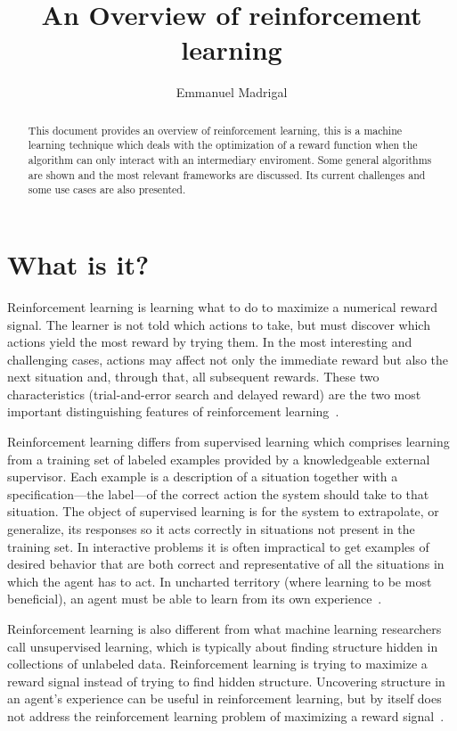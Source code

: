 \documentclass[letterpaper, 10 pt]{IEEEconf}
\title{\LARGE \bf
An Overview of reinforcement learning
}
\author{Emmanuel Madrigal%
}
\begin{document}
\maketitle{}

\begin{abstract}
	This document provides an overview of reinforcement learning, this
	is a machine learning technique which deals with the optimization of
	a reward function when the algorithm can only interact with an
	intermediary enviroment. Some general algorithms are shown and the
	most relevant frameworks are discussed. Its current challenges and
	some use cases are also presented.
\end{abstract}

\section{What is it?}

Reinforcement learning is learning what to do to maximize a numerical
reward signal. The learner is not told which actions to take, but must
discover which actions yield the most reward by trying them. In the
most interesting and challenging cases, actions may affect not only
the immediate reward but also the next situation and, through that,
all subsequent rewards. These two characteristics (trial-and-error
search and delayed reward) are the two most important distinguishing
features of reinforcement learning~\cite{sutton2018reinforcement}.

Reinforcement learning differs from supervised learning which
comprises learning from a training set of labeled examples provided by
a knowledgeable external supervisor. Each example is a description of
a situation together with a specification—the label—of the correct
action the system should take to that situation. The object of
supervised learning is for the system to extrapolate, or generalize,
its responses so it acts correctly in situations not present in the
training set. In interactive problems it is often impractical to get
examples of desired behavior that are both correct and representative
of all the situations in which the agent has to act. In uncharted
territory (where learning to be most beneficial), an agent must be
able to learn from its own experience~\cite{sutton2018reinforcement}.

Reinforcement learning is also different from what machine learning
researchers call unsupervised learning, which is typically about
finding structure hidden in collections of unlabeled
data. Reinforcement learning is trying to maximize a reward signal
instead of trying to find hidden structure. Uncovering structure in an
agent’s experience can be useful in reinforcement learning, but by
itself does not address the reinforcement learning problem of
maximizing a reward signal~\cite{sutton2018reinforcement}.
\end{document}
